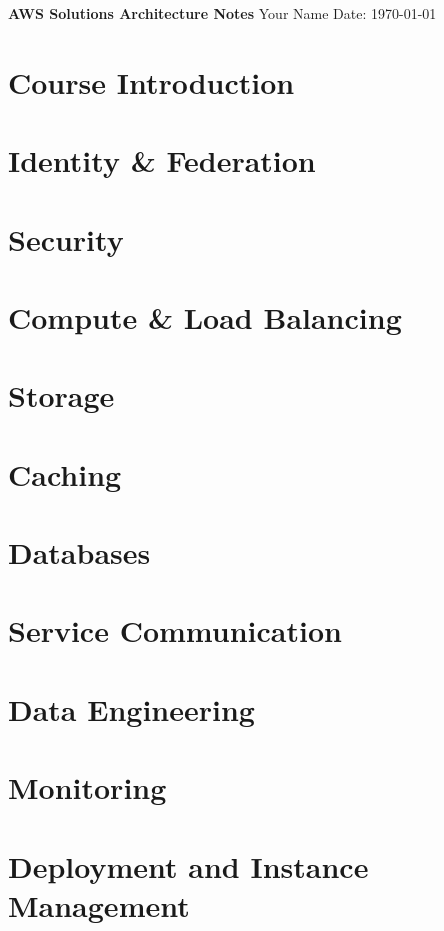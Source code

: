\documentclass[11pt]{book}
\begin{document}
    \begin{titlepage}
        \centering
        \vspace*{2in}
        \Huge \textbf{AWS Solutions Architecture Notes}
        \vfill
        \Large Your Name
        \vfill
        \Large Date: \today
    \end{titlepage}

    \newpage

    \tableofcontents
    \newpage


    \chapter{Course Introduction}
    \chapter{Identity \& Federation}
    \chapter{Security}
    \chapter{Compute \& Load Balancing}
    \chapter{Storage}
    \chapter{Caching}
    \chapter{Databases}
    \chapter{Service Communication}
    \chapter{Data Engineering}
    \chapter{Monitoring}
    \chapter{Deployment and Instance Management}
\end{document}
